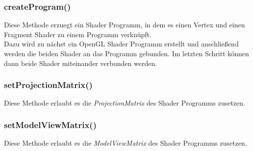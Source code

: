 \subsubsection{createProgram()}
Diese Methode erzuegt ein Shader Programm, in dem es einen Vertex und einen Fragment Shader zu einem Programm verknüpft.\\
Dazu wird zu nächst ein OpenGL Shader Programm erstellt und anschließend werden die beiden Shader an das Programm gebunden. 
Im letzten Schritt können dann beide Shader miteinander verbunden werden.

\subsubsection{setProjectionMatrix()}
Diese Methode erlaubt es die \textit{ProjectionMatrix} des Shader Programms zusetzen.

\subsubsection{setModelViewMatrix()}
Diese Methode erlaubt es die \textit{ModelViewMatrix} des Shader Programms zusetzen.






